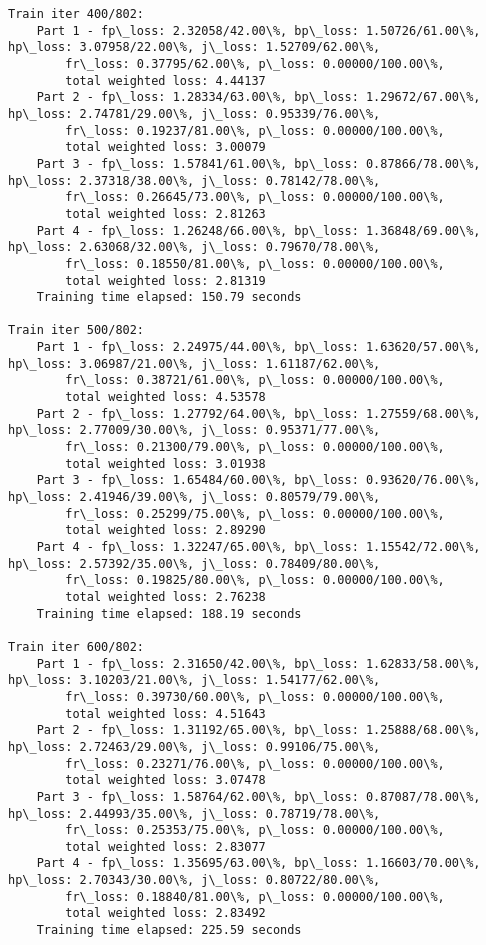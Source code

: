 \documentclass[11pt]{article}
\begin{document}
\begin{Verbatim}[commandchars=\\\{\}]
Train iter 400/802:
	Part 1 - fp\_loss: 2.32058/42.00\%, bp\_loss: 1.50726/61.00\%, hp\_loss: 3.07958/22.00\%, j\_loss: 1.52709/62.00\%, 
		fr\_loss: 0.37795/62.00\%, p\_loss: 0.00000/100.00\%, 
		total weighted loss: 4.44137
	Part 2 - fp\_loss: 1.28334/63.00\%, bp\_loss: 1.29672/67.00\%, hp\_loss: 2.74781/29.00\%, j\_loss: 0.95339/76.00\%, 
		fr\_loss: 0.19237/81.00\%, p\_loss: 0.00000/100.00\%, 
		total weighted loss: 3.00079
	Part 3 - fp\_loss: 1.57841/61.00\%, bp\_loss: 0.87866/78.00\%, hp\_loss: 2.37318/38.00\%, j\_loss: 0.78142/78.00\%, 
		fr\_loss: 0.26645/73.00\%, p\_loss: 0.00000/100.00\%, 
		total weighted loss: 2.81263
	Part 4 - fp\_loss: 1.26248/66.00\%, bp\_loss: 1.36848/69.00\%, hp\_loss: 2.63068/32.00\%, j\_loss: 0.79670/78.00\%, 
		fr\_loss: 0.18550/81.00\%, p\_loss: 0.00000/100.00\%, 
		total weighted loss: 2.81319
	Training time elapsed: 150.79 seconds

Train iter 500/802:
	Part 1 - fp\_loss: 2.24975/44.00\%, bp\_loss: 1.63620/57.00\%, hp\_loss: 3.06987/21.00\%, j\_loss: 1.61187/62.00\%, 
		fr\_loss: 0.38721/61.00\%, p\_loss: 0.00000/100.00\%, 
		total weighted loss: 4.53578
	Part 2 - fp\_loss: 1.27792/64.00\%, bp\_loss: 1.27559/68.00\%, hp\_loss: 2.77009/30.00\%, j\_loss: 0.95371/77.00\%, 
		fr\_loss: 0.21300/79.00\%, p\_loss: 0.00000/100.00\%, 
		total weighted loss: 3.01938
	Part 3 - fp\_loss: 1.65484/60.00\%, bp\_loss: 0.93620/76.00\%, hp\_loss: 2.41946/39.00\%, j\_loss: 0.80579/79.00\%, 
		fr\_loss: 0.25299/75.00\%, p\_loss: 0.00000/100.00\%, 
		total weighted loss: 2.89290
	Part 4 - fp\_loss: 1.32247/65.00\%, bp\_loss: 1.15542/72.00\%, hp\_loss: 2.57392/35.00\%, j\_loss: 0.78409/80.00\%, 
		fr\_loss: 0.19825/80.00\%, p\_loss: 0.00000/100.00\%, 
		total weighted loss: 2.76238
	Training time elapsed: 188.19 seconds

Train iter 600/802:
	Part 1 - fp\_loss: 2.31650/42.00\%, bp\_loss: 1.62833/58.00\%, hp\_loss: 3.10203/21.00\%, j\_loss: 1.54177/62.00\%, 
		fr\_loss: 0.39730/60.00\%, p\_loss: 0.00000/100.00\%, 
		total weighted loss: 4.51643
	Part 2 - fp\_loss: 1.31192/65.00\%, bp\_loss: 1.25888/68.00\%, hp\_loss: 2.72463/29.00\%, j\_loss: 0.99106/75.00\%, 
		fr\_loss: 0.23271/76.00\%, p\_loss: 0.00000/100.00\%, 
		total weighted loss: 3.07478
	Part 3 - fp\_loss: 1.58764/62.00\%, bp\_loss: 0.87087/78.00\%, hp\_loss: 2.44993/35.00\%, j\_loss: 0.78719/78.00\%, 
		fr\_loss: 0.25353/75.00\%, p\_loss: 0.00000/100.00\%, 
		total weighted loss: 2.83077
	Part 4 - fp\_loss: 1.35695/63.00\%, bp\_loss: 1.16603/70.00\%, hp\_loss: 2.70343/30.00\%, j\_loss: 0.80722/80.00\%, 
		fr\_loss: 0.18840/81.00\%, p\_loss: 0.00000/100.00\%, 
		total weighted loss: 2.83492
	Training time elapsed: 225.59 seconds


\end{Verbatim}
\end{document}
